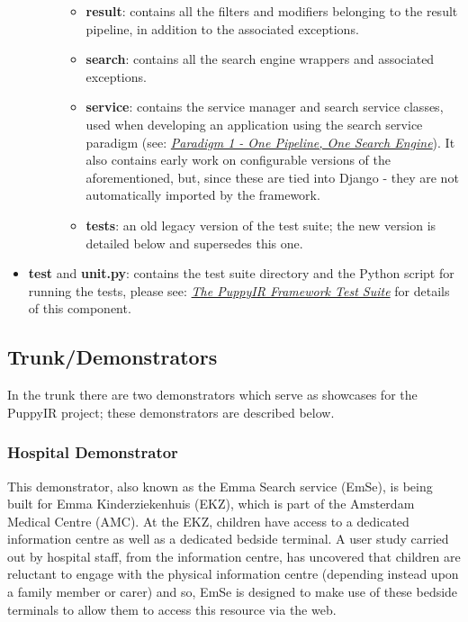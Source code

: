 \documentclass[letterpaper,10pt,english]{sphinxmanual}
\begin{document}
\begin{itemize}
\begin{description}
\begin{itemize}
\item {} 
\textbf{result}: contains all the filters and modifiers belonging to the result pipeline, in addition to the associated exceptions.

\item {} 
\textbf{search}: contains all the search engine wrappers and associated exceptions.

\item {} 
\textbf{service}: contains the service manager and search service classes, used when developing an application using the search service paradigm (see: {\hyperref[service:service-architecture]{\emph{Paradigm 1 - One Pipeline, One Search Engine}}}). It also contains early work on configurable versions of the aforementioned, but, since these are tied into Django - they are not automatically imported by the framework.

\item {} 
\textbf{tests}: an old legacy version of the test suite; the new version is detailed below and supersedes this one.

\end{itemize}

\end{description}

\item {} 
\textbf{test} and \textbf{unit.py}: contains the test suite directory and the Python script for running the tests, please see: {\hyperref[test-suite:the-puppyir-framework-test-suite]{\emph{The PuppyIR Framework Test Suite}}} for details of this component.

\end{itemize}


\subsection{Trunk/Demonstrators}
\label{repo:trunk-demonstrators}
In the trunk there are two demonstrators which serve as showcases for the PuppyIR project; these demonstrators are described below.


\subsubsection{Hospital Demonstrator}
\label{repo:hospital-demonstrator}
This demonstrator, also known as the Emma Search service (EmSe), is being built for Emma Kinderziekenhuis (EKZ), which is part of the Amsterdam
Medical Centre (AMC). At the EKZ, children have access to a dedicated information centre as well as a dedicated bedside terminal. A user study carried out by hospital staff, from the information centre, has uncovered that children are reluctant to engage with the physical information centre (depending instead upon a family member or carer) and so, EmSe is designed to make use of these bedside terminals to allow them to access this resource via the web.
\end{document}
